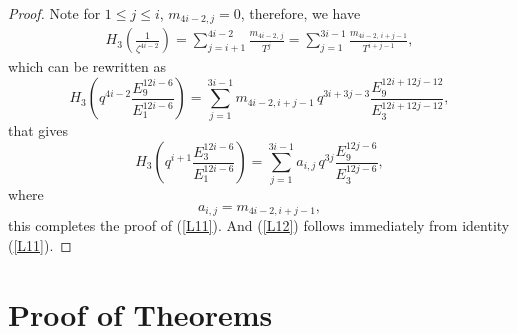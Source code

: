 \documentclass[11pt,a4paper]{article}
\numberwithin{equation}{section}
\theoremstyle{plain}
\begin{document}
\begin{proof}
Note for $1\leq j \leq i$, $m_{4i-2,j}=0$, therefore, we have
\noindent
\begin{align*}\label{a15}
	H_3\!\left(\frac{1}{\zeta^{4i-2}}\right)
	= \sum_{j= i+1}^{4i-2} \frac{m_{4i-2,\,j}}{T^{j}}
	= \sum_{j= 1}^{3i-1} \frac{m_{4i-2,\,i+j-1}}{T^{i+j-1}},
\end{align*}
which can be rewritten as
\begin{equation*}
	H_{3}\!\left(q^{4i-2}\frac{E_{9}^{12i-6}}{E_{1}^{12i-6}}\right)
	=
	\sum_{j=1}^{3i-1}
	m_{4i-2,i+j-1}\,
	q^{3i+3j-3}
	\frac{E_{9}^{12i+12j-12}}{E_{3}^{12i+12j-12}},
\end{equation*}
that gives
\begin{equation*}
H_{3}\!\left(q^{i+1}\frac{E_{3}^{12i-6}}{E_{1}^{12i-6}}\right)
=
\sum_{j=1}^{3i-1} a_{i,j}\,
q^{3j}\frac{E_{9}^{12j-6}}{E_{3}^{12j-6}},
\end{equation*}
where
\[
a_{i,j}=m_{4i-2,i+j-1},
\]
this completes the proof of (\ref{L11}). And (\ref{L12}) follows immediately from identity (\ref{L11}).
\end{proof}
	\section{Proof of Theorems }
	
\end{document}

